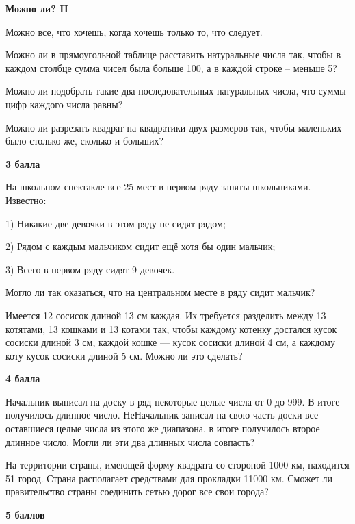 \centerline{\bf \Huge Можно ли? II}

\begin{flushright}
        \scriptsize{Можно все, что хочешь, когда хочешь только то, что следует.}
\end{flushright}

 Можно ли в прямоугольной таблице расставить натуральные числа так, чтобы в каждом столбце сумма чисел была больше 100, а в каждой строке – меньше 5?

 Можно ли подобрать такие два последовательных натуральных числа, что суммы цифр каждого числа равны?

 Можно ли разрезать квадрат на квадратики двух размеров так, чтобы маленьких было столько же, сколько и больших?

\begin{flushright} \textbf{3 балла}\\ 
\end{flushright}

 На школьном спектакле все 25 мест в первом ряду заняты
школьниками. Известно:

1) Никакие две девочки в этом ряду не сидят рядом;

2) Рядом с каждым мальчиком сидит ещё хотя бы один мальчик;

3) Всего в первом ряду сидят 9 девочек.

Могло ли так оказаться, что на центральном месте в ряду сидит мальчик?

 Имеется 12 сосисок длиной 13 см каждая. Их
требуется разделить между 13 котятами, 13 кошками и 13 котами так, чтобы каждому
котенку достался кусок сосиски длиной 3 см, каждой кошке — кусок сосиски длиной
4 см, а каждому коту кусок сосиски длиной 5 см. Можно ли это сделать?
\begin{flushright} \textbf{4 балла}\\ 
\end{flushright}


 Начальник выписал на доску в ряд некоторые целые числа от 0 до
999. В итоге получилось длинное число. НеНачальник записал на свою часть доски все оставшиеся
целые числа из этого же диапазона, в итоге получилось второе длинное число. Могли ли эти
два длинных числа совпасть?


 На территории страны, имеющей форму квадрата со стороной 1000 км, находится 51 город. Страна располагает средствами для прокладки 11000 км. Сможет ли правительство страны соединить сетью дорог все свои города?

\begin{flushright} \textbf{5 баллов}\\ 
\end{flushright}